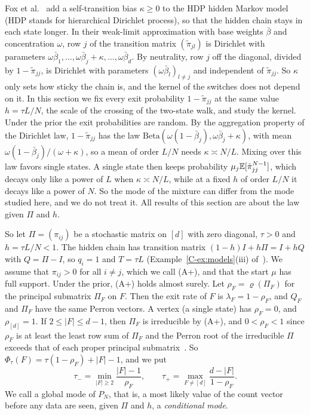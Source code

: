 Fox et al.~\cite{fox2011} add a self-transition bias $\kappa\ge0$ to the HDP
hidden Markov model (HDP stands for hierarchical Dirichlet process), so that
the hidden chain stays in each state longer. In their weak-limit approximation
with base weights $\bar\beta$ and concentration $\omega$, row $j$ of the
transition matrix $(\tilde\pi_{jl})$ is Dirichlet with parameters
$\omega\bar\beta_1,\dots,\omega\bar\beta_j+\kappa,\dots,\omega\bar\beta_d$. By
neutrality, row $j$ off the diagonal, divided by $1-\tilde\pi_{jj}$, is Dirichlet
with parameters $(\omega\bar\beta_l)_{l\ne j}$ and independent of $\tilde\pi_{jj}$. So
$\kappa$ only sets how sticky the chain is, and the kernel of the switches does
not depend on it. In this section we fix every exit probability $1-\tilde\pi_{jj}$ at
the same value $h=\tau L/N$, the scale of the crossing of the two-state walk, and study the
kernel. Under the prior the exit probabilities are random. By the aggregation
property of the Dirichlet law, $1-\tilde\pi_{jj}$ has the law
$\mathrm{Beta}(\omega(1-\bar\beta_j),\omega\bar\beta_j+\kappa)$, with mean
$\omega(1-\bar\beta_j)/(\omega+\kappa)$, so a mean of order $L/N$ needs
$\kappa\asymp N/L$. Mixing over this law favors single states. A single state then
keeps probability $\mu_j\mathbb E[\tilde\pi_{jj}^{N-1}]$, which decays only like a power of
$L$ when $\kappa\asymp N/L$, while at a fixed $h$ of order $L/N$ it decays like a power
of $N$. So the mode of the mixture can differ from the mode studied here, and we do not
treat it. All results of this section are about the law given $\Pi$ and $h$.

So let $\Pi=(\pi_{ij})$ be a stochastic matrix on $[d]$ with zero diagonal,
$\tau>0$ and $h=\tau L/N<1$. The hidden chain has transition matrix
$(1-h)I+h\Pi=I+hQ$ with $Q=\Pi-I$, so
$q_i=1$ and $T=\tau L$ (Example~\ref*{C-ex:models}(iii) of~\cite{paperC}). We assume that
$\pi_{ij}>0$ for all $i\ne j$, which we call (A+), and that the start $\mu$ has
full support. Under the prior, \textup{(A+)} holds almost surely. Let
$\rho_F=\varrho(\Pi_F)$ for the principal submatrix $\Pi_F$ on $F$. Then the
exit rate of $F$ is $\lambda_F=1-\rho_F$, and
$Q_F$ and $\Pi_F$ have the same Perron vectors. A vertex (a single state) has
$\rho_F=0$, and
$\rho_{[d]}=1$. If $2\le|F|\le d-1$, then $\Pi_F$ is irreducible by (A+), and
$0<\rho_F<1$ since $\rho_F$ is at least the least row sum of $\Pi_F$ and the
Perron root of the irreducible $\Pi$ exceeds that of each proper principal
submatrix~\cite{bermanplemmons1994}. So
$\Phi_\tau(F)=\tau(1-\rho_F)+|F|-1$, and we put
\[
 \tau_-=\min_{|F|\ge2}\frac{|F|-1}{\rho_F},\qquad
 \tau_+=\max_{F\ne[d]}\frac{d-|F|}{1-\rho_F}.
\]
We call a global mode of $P_N$, that is, a most likely value of the count
vector before any data are seen, given $\Pi$ and $h$, a \emph{conditional mode}.

